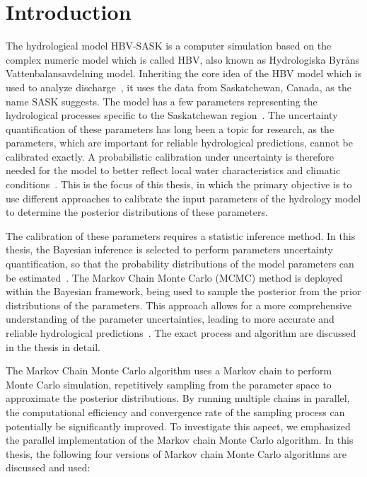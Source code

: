 \chapter{Introduction}

The hydrological model HBV-SASK is a computer simulation based on the complex numeric model which is called HBV, also known as Hydrologiska Byråns Vattenbalansavdelning model. Inheriting the core idea of the HBV model which is used to analyze discharge~\cite{hbv_intro}, it uses the data from Saskatchewan, Canada, as the name SASK suggests. The model has a few parameters representing the hydrological processes specific to the Saskatchewan region~\cite{hydrology}. The uncertainty quantification of these parameters has long been a topic for research, as the parameters, which are important for reliable hydrological predictions, cannot be calibrated exactly. A probabilistic calibration under uncertainty is therefore needed for the model to better reflect local water characteristics and climatic conditions~\cite{hbv_calibration_intro}. This is the focus of this thesis, in which the primary objective is to use different approaches to calibrate the input parameters of the hydrology model to determine the posterior distributions of these parameters.

The calibration of these parameters requires a statistic inference method. In this thesis, the Bayesian inference is selected to perform parameters uncertainty quantification, so that the probability distributions of the model parameters can be estimated~\cite{bayesian_uq_intro}. The Markov Chain Monte Carlo (MCMC) method is deployed within the Bayesian framework, being used to sample the posterior from the prior distributions of the parameters. This approach allows for a more comprehensive understanding of the parameter uncertainties, leading to more accurate and reliable hydrological predictions~\cite{mcmc_practice}. The exact process and algorithm are discussed in the thesis in detail.

The Markov Chain Monte Carlo algorithm uses a Markov chain to perform Monte Carlo simulation, repetitively sampling from the parameter space to approximate the posterior distributions. By running multiple chains in parallel, the computational efficiency and convergence rate of the sampling process can potentially be significantly improved. To investigate this aspect, we emphasized the parallel implementation of the Markov chain Monte Carlo algorithm. In this thesis, the following four versions of Markov chain Monte Carlo algorithms are discussed and used:

